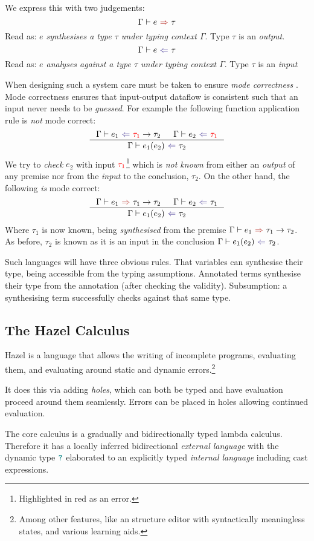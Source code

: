 We express this with two judgements:
\[\synthesis{e}{\tau}\]
Read as: \textit{$e$ synthesises a type $\tau$ under typing context $\Gamma$}. Type $\tau$ is an \textit{output}.
\[\analysis{e}{\tau}\]
Read as: \textit{$e$ analyses against a type $\tau$ under typing context $\Gamma$}. Type $\tau$ is an \textit{input}

When designing such a system care must be taken to ensure \textit{mode correctness} \cite{ModeCorrectness}. Mode correctness ensures that input-output dataflow is consistent such that an input never needs to be \textit{guessed}. For example the following function application rule is \textit{not} mode correct:
\[\inference{\analysis{e_1}{{\color{red}\tau_1} \to \tau_2} & \analysis{e_2}{{\color{red}\tau_1}}}{\analysis{e_1(e_2)}{\tau_2}}\]
We try to \textit{check} $e_2$ with input ${\color{red}\tau_1}$\footnote{Highlighted in red as an error.} which is \textit{not known} from either an \textit{output} of any premise nor from the \textit{input} to the conclusion, $\tau_2$. On the other hand, the following \textit{is} mode correct:
\[\inference{\synthesis{e_1}{\tau_1 \to \tau_2} & \analysis{e_2}{\tau_1}}{\analysis{e_1(e_2)}{\tau_2}}\]
Where $\tau_1$ is now known, being \textit{synthesised} from the premise $\synthesis{e_1}{\tau_1 \to \tau_2}$. As before, $\tau_2$ is known as it is an input in the conclusion $\analysis{e_1(e_2)}{\tau_2}$.

Such languages will have three obvious rules. That variables can synthesise their type, being accessible from the typing assumptions. Annotated terms synthesise their type from the annotation (after checking the validity). Subsumption: a synthesising term successfully checks against that same type.

\subsection{The Hazel Calculus}\label{sec:CoreHazel}
Hazel is a language that allows the writing of incomplete programs, evaluating them, and evaluating around static and dynamic errors.\footnote{Among other features, like an structure editor with syntactically meaningless states, and various learning aids.}

It does this via adding \textit{holes}, which can both be typed and have evaluation proceed around them seamlessly. Errors can be placed in holes allowing continued evaluation.

The core calculus \cite{HazelLivePaper} is a gradually and bidirectionally typed lambda calculus. Therefore it has a locally inferred bidirectional \textit{external language} with the dynamic type ${\color{teal}\texttt{?}}$ elaborated to an explicitly typed \textit{internal language} including cast expressions. 

